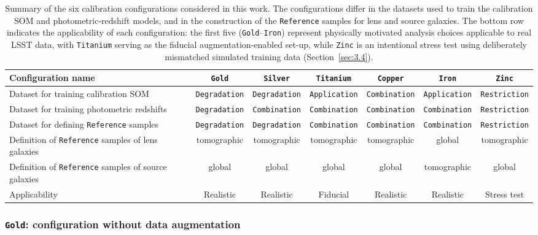 \begin{table}
    \centering
    \begin{tabular}{p{4.5cm}cccccc}
        \toprule
        Configuration name & \texttt{Gold} & \texttt{Silver} & \texttt{Titanium} & \texttt{Copper} & \texttt{Iron} & \texttt{Zinc} \\
        \midrule
        Dataset for training calibration SOM & \texttt{Degradation} & \texttt{Degradation} & \texttt{Application} & \texttt{Combination} & \texttt{Application} & \texttt{Restriction} \\
        Dataset for training photometric redshifts & \texttt{Degradation} & \texttt{Combination} & \texttt{Combination} & \texttt{Combination} & \texttt{Combination} & \texttt{Restriction} \\
        Dataset for defining \texttt{Reference} samples & \texttt{Degradation} & \texttt{Degradation} & \texttt{Combination} & \texttt{Combination} & \texttt{Combination} & \texttt{Restriction} \\
        Definition of \texttt{Reference} samples of lens galaxies & tomographic & tomographic & tomographic & tomographic & global & tomographic \\
        Definition of \texttt{Reference} samples of source galaxies & global & global & global & global & tomographic & global \\
        Applicability & Realistic & Realistic & Fiducial & Realistic & Realistic & Stress test \\
        \bottomrule
    \end{tabular}
    \caption{Summary of the six calibration configurations considered in this work. The configurations differ in the datasets used to train the calibration SOM and photometric-redshift models, and in the construction of the \texttt{Reference} samples for lens and source galaxies. The bottom row indicates the applicability of each configuration: the first five (\texttt{Gold}--\texttt{Iron}) represent physically motivated analysis choices applicable to real LSST data, with \texttt{Titanium} serving as the fiducial augmentation-enabled set-up, while \texttt{Zinc} is an intentional stress test using deliberately mismatched simulated training data (Section~\ref{sec:3.4}).}
\label{tab:2}
\end{table}

\subsubsection{\texttt{Gold}: configuration without data augmentation} \label{sec:3.4.1}

